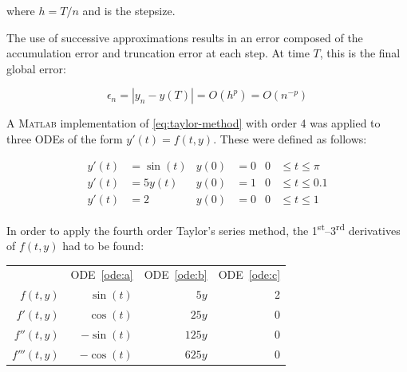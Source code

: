 \documentclass[a4paper,12pt,twocolumn]{article}
\begin{document}
\hspace{-\parindent}where $h = T/n$ and is the stepsize.

The use of successive approximations results in an error composed of the
accumulation error and truncation error at each step. At time $T$, this is
the final global error:
\begin{footnotesize}
    \vspace{-0.5\baselineskip}
    \begin{equation} \label{eq:error}
        \epsilon_n = |y_n - y(T)| = O(h^p) = O(n^{-p})
    \end{equation}
    \vspace{-1.5\baselineskip}
\end{footnotesize}

A \textsc{Matlab} implementation of \eqref{eq:taylor-method} with order 4 was
applied to three ODEs of the form $y'(t) = f(t,y)$. These were defined as
follows:
\begin{footnotesize}
    \vspace{-0.5\baselineskip}
    \begin{align}
        \tag{a}\label{ode:a}
        y'(t) &= \sin(t) & y(0) &= 0 & 0 &\leq t \leq \pi  \\
        \tag{b}\label{ode:b}
        y'(t) &= 5y(t)   & y(0) &= 1 & 0 &\leq t \leq 0.1 \\
        \tag{c}\label{ode:c}
        y'(t) &= 2       & y(0) &= 0 & 0 &\leq t \leq 1
    \end{align}
    \vspace{-1.5\baselineskip}
\end{footnotesize}

In order to apply the fourth order Taylor's series method, the 
1\textsuperscript{st}--3\textsuperscript{rd} derivatives of $f(t, y)$ had
to be found:
\begin{table}[H]
    \centering
    \footnotesize
    \vspace{-\baselineskip}
    \begin{tabular}{rrrr}
        & ODE~\eqref{ode:a} & ODE~\eqref{ode:b} & ODE~\eqref{ode:c} \\
        \cmidrule(lr){2-2}\cmidrule(lr){3-3}\cmidrule(lr){4-4}
        $f(t,y)$\tnote{*} & $\sin(t)$  & $5y$   & 2 \\
        $f'(t,y)$         & $\cos(t)$  & $25y$  & 0 \\
        $f''(t,y)$        & $-\sin(t)$ & $125y$ & 0 \\
        $f'''(t,y)$       & $-\cos(t)$ & $625y$ & 0 \\
    \end{tabular}
\vspace{-\baselineskip}
\end{table}
\end{document}
